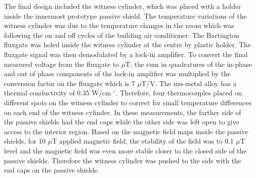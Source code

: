 \documentclass[review]{elsarticle}
\begin{document}
The final design included the witness cylinder, which was placed with a holder inside the innermost prototype passive shield. The temperature variations of the witness cylinder was due to the temperature changes in the room which was following the on and off cycles of the building air conditioner. The Bartington fluxgate was holed inside the witness cylinder at the centre by plastic holder. The fluxgate signal was then demodulated by a lock-in amplifier. To convert the final measured voltage from the fluxgate to $\mu$T, the sum in quadratures of the in-phase and out of phase components of the lock-in amplifier was multiplied by the conversion factor on the fluxgate which is 7 $\mu$T/V.  
The mu-metal alloy has a thermal conductivity of 0.35 W/cm $^{\circ}$. Therefore, four thermocouples placed on different spots on the witness cylinder to correct for small temperature differences on each end of the witness cylinder.
In these measurements, the farther side of the passive shields had the end caps while the other side was left open to give access to the interior region. Based on the magnetic field maps inside the passive shields, for 10 $\mu$T applied magnetic field, the stability of the field was to 0.1 $\mu$T level and the magnetic field was even more stable closer to the closed side of the passive shields. Therefore the witness cylinder was pushed to the side with the end caps on the passive shields. 




%
\end{document}
